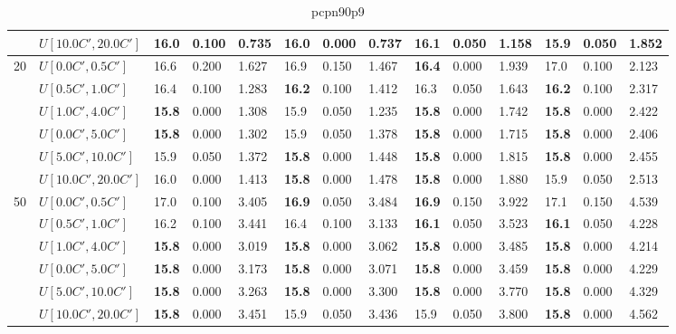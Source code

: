 \begin{table}[h]
{\begin{tabular}{|l|l||l|l|l||l|l|l||l|l|l||l|l|l|}
       & $U[10.0C',20.0C']$ & 16.0 & 0.100 & 0.735 & 16.0 & 0.000 & 0.737 & 16.1 & 0.050 & 1.158 & \textbf{15.9} & 0.050 & 1.852 \\
      \hline\hline
      \multirow{6}{*}{20} & $U[0.0C',0.5C']$ & 16.6 & 0.200 & 1.627 & 16.9 & 0.150 & 1.467 & \textbf{16.4} & 0.000 & 1.939 & 17.0 & 0.100 & 2.123 \\
       & $U[0.5C',1.0C']$ & 16.4 & 0.100 & 1.283 & \textbf{16.2} & 0.100 & 1.412 & 16.3 & 0.050 & 1.643 & \textbf{16.2} & 0.100 & 2.317 \\
       & $U[1.0C',4.0C']$ & \textbf{15.8} & 0.000 & 1.308 & 15.9 & 0.050 & 1.235 & \textbf{15.8} & 0.000 & 1.742 & \textbf{15.8} & 0.000 & 2.422 \\
       & $U[0.0C',5.0C']$ & \textbf{15.8} & 0.000 & 1.302 & 15.9 & 0.050 & 1.378 & \textbf{15.8} & 0.000 & 1.715 & \textbf{15.8} & 0.000 & 2.406 \\
       & $U[5.0C',10.0C']$ & 15.9 & 0.050 & 1.372 & \textbf{15.8} & 0.000 & 1.448 & \textbf{15.8} & 0.000 & 1.815 & \textbf{15.8} & 0.000 & 2.455 \\
       & $U[10.0C',20.0C']$ & 16.0 & 0.000 & 1.413 & \textbf{15.8} & 0.000 & 1.478 & \textbf{15.8} & 0.000 & 1.880 & 15.9 & 0.050 & 2.513 \\
      \hline\hline
      \multirow{6}{*}{50} & $U[0.0C',0.5C']$ & 17.0 & 0.100 & 3.405 & \textbf{16.9} & 0.050 & 3.484 & \textbf{16.9} & 0.150 & 3.922 & 17.1 & 0.150 & 4.539 \\
       & $U[0.5C',1.0C']$ & 16.2 & 0.100 & 3.441 & 16.4 & 0.100 & 3.133 & \textbf{16.1} & 0.050 & 3.523 & \textbf{16.1} & 0.050 & 4.228 \\
       & $U[1.0C',4.0C']$ & \textbf{15.8} & 0.000 & 3.019 & \textbf{15.8} & 0.000 & 3.062 & \textbf{15.8} & 0.000 & 3.485 & \textbf{15.8} & 0.000 & 4.214 \\
       & $U[0.0C',5.0C']$ & \textbf{15.8} & 0.000 & 3.173 & \textbf{15.8} & 0.000 & 3.071 & \textbf{15.8} & 0.000 & 3.459 & \textbf{15.8} & 0.000 & 4.229 \\
       & $U[5.0C',10.0C']$ & \textbf{15.8} & 0.000 & 3.263 & \textbf{15.8} & 0.000 & 3.300 & \textbf{15.8} & 0.000 & 3.770 & \textbf{15.8} & 0.000 & 4.329 \\
       & $U[10.0C',20.0C']$ & \textbf{15.8} & 0.000 & 3.451 & 15.9 & 0.050 & 3.436 & 15.9 & 0.050 & 3.800 & \textbf{15.8} & 0.000 & 4.562 \\
      \hline
      \end{tabular}
      }
      \caption{pcpn90p9}
      \label{tab:pcpn90p9}\end{table}


